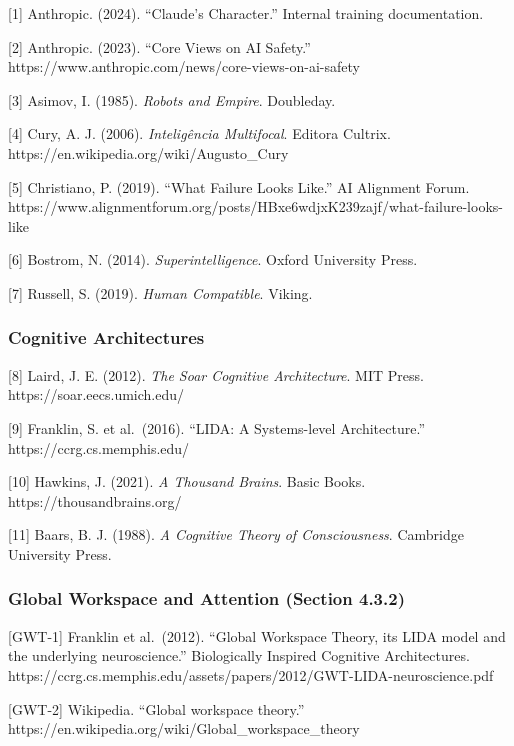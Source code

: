 \documentclass[
]{article}
\begin{document}
{[}1{]} Anthropic. (2024). ``Claude's Character.'' Internal training
documentation.

{[}2{]} Anthropic. (2023). ``Core Views on AI Safety.''
https://www.anthropic.com/news/core-views-on-ai-safety

{[}3{]} Asimov, I. (1985). \emph{Robots and Empire}. Doubleday.

{[}4{]} Cury, A. J. (2006). \emph{Inteligência Multifocal}. Editora
Cultrix. https://en.wikipedia.org/wiki/Augusto\_Cury

{[}5{]} Christiano, P. (2019). ``What Failure Looks Like.'' AI Alignment
Forum.
https://www.alignmentforum.org/posts/HBxe6wdjxK239zajf/what-failure-looks-like

{[}6{]} Bostrom, N. (2014). \emph{Superintelligence}. Oxford University
Press.

{[}7{]} Russell, S. (2019). \emph{Human Compatible}. Viking.

\hypertarget{cognitive-architectures}{%
\subsubsection{Cognitive Architectures}\label{cognitive-architectures}}

{[}8{]} Laird, J. E. (2012). \emph{The Soar Cognitive Architecture}. MIT
Press. https://soar.eecs.umich.edu/

{[}9{]} Franklin, S. et al.~(2016). ``LIDA: A Systems-level
Architecture.'' https://ccrg.cs.memphis.edu/

{[}10{]} Hawkins, J. (2021). \emph{A Thousand Brains}. Basic Books.
https://thousandbrains.org/

{[}11{]} Baars, B. J. (1988). \emph{A Cognitive Theory of
Consciousness}. Cambridge University Press.

\hypertarget{global-workspace-and-attention-section-4.3.2}{%
\subsubsection{Global Workspace and Attention (Section
4.3.2)}\label{global-workspace-and-attention-section-4.3.2}}

{[}GWT-1{]} Franklin et al.~(2012). ``Global Workspace Theory, its LIDA
model and the underlying neuroscience.'' Biologically Inspired Cognitive
Architectures.
https://ccrg.cs.memphis.edu/assets/papers/2012/GWT-LIDA-neuroscience.pdf

{[}GWT-2{]} Wikipedia. ``Global workspace theory.''
https://en.wikipedia.org/wiki/Global\_workspace\_theory
\end{document}
